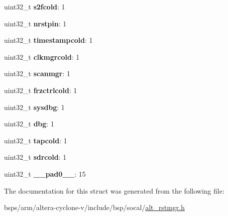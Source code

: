 \begin{DoxyCompactItemize}
uint32\+\_\+t {\bfseries s2fcold}\+: 1
\item 
\mbox{\label{structALT__RSTMGR__MISCMODRST__s_af89bf5f373a482af34cd0f509aaf792b}} 
uint32\+\_\+t {\bfseries nrstpin}\+: 1
\item 
\mbox{\label{structALT__RSTMGR__MISCMODRST__s_acf658bda6e140c03bf92880dbcd8e0d3}} 
uint32\+\_\+t {\bfseries timestampcold}\+: 1
\item 
\mbox{\label{structALT__RSTMGR__MISCMODRST__s_a686e205a11370365050c444631bb1520}} 
uint32\+\_\+t {\bfseries clkmgrcold}\+: 1
\item 
\mbox{\label{structALT__RSTMGR__MISCMODRST__s_ad062e4b38e04d2a5bc208acc251d80d7}} 
uint32\+\_\+t {\bfseries scanmgr}\+: 1
\item 
\mbox{\label{structALT__RSTMGR__MISCMODRST__s_ad977cebbcef639f5f5c4f31f98876a56}} 
uint32\+\_\+t {\bfseries frzctrlcold}\+: 1
\item 
\mbox{\label{structALT__RSTMGR__MISCMODRST__s_a1cc090e398fb61d0fc593d6af2f65d6a}} 
uint32\+\_\+t {\bfseries sysdbg}\+: 1
\item 
\mbox{\label{structALT__RSTMGR__MISCMODRST__s_ac9aba8b0c5a1428f21ecafe3eb38e0c7}} 
uint32\+\_\+t {\bfseries dbg}\+: 1
\item 
\mbox{\label{structALT__RSTMGR__MISCMODRST__s_af959092e4b4999a76400a8db774055b2}} 
uint32\+\_\+t {\bfseries tapcold}\+: 1
\item 
\mbox{\label{structALT__RSTMGR__MISCMODRST__s_ae43d8630f4dc53d0eb3275c5f0719786}} 
uint32\+\_\+t {\bfseries sdrcold}\+: 1
\item 
\mbox{\label{structALT__RSTMGR__MISCMODRST__s_a3ac0829e1e5569fa241b355aff612f00}} 
uint32\+\_\+t {\bfseries \+\_\+\+\_\+pad0\+\_\+\+\_\+}\+: 15
\end{DoxyCompactItemize}


The documentation for this struct was generated from the following file\+:\begin{DoxyCompactItemize}
\item 
bsps/arm/altera-\/cyclone-\/v/include/bsp/socal/\mbox{\hyperlink{alt__rstmgr_8h}{alt\+\_\+rstmgr.\+h}}\end{DoxyCompactItemize}
